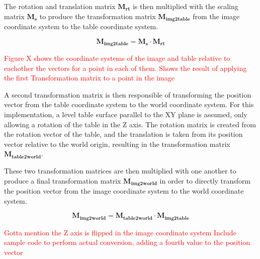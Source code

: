 The rotation and translation matrix $\mathbf{M_{rt}}$ is then multiplied with the scaling matrix $\mathbf{M_s}$ to produce the transformation matrix $\mathbf{M_{img2table}}$ from the image coordinate system to the table coordinate system.

$$\mathbf{M_{img2table}} = \mathbf{M_s} \cdot \mathbf{M_{rt}}$$

\textcolor{red}{Figure X shows the coordinate systems of the image and table relative to eachother the vectors for a point in each of them. Shows the result of applying the first Transformation matrix to a point in the image} %


A second transformation matrix is then responsible of transforming the position vector from the table coordinate system to the world coordinate system. For this implementation, a level table surface parallel to the XY plane is assumed, only allowing a rotation of the table in the Z axis. The rotation matrix is created from the rotation vector of the table, and the translation is taken from its position vector relative to the world origin, resulting in the transformation matrix $\mathbf{M_{table2world}}$.

These two transformation matrices are then multiplied with one another to produce a final transformation matrix $\mathbf{M_{img2world}}$ in order to directly transform the position vector from the image coordinate system to the world coordinate system.

$$\mathbf{M_{img2world}} = \mathbf{M_{table2world}} \cdot \mathbf{M_{img2table}}$$



\textcolor{red}{ Gotta mention the Z axis is flipped in the image coordinate system } %
\textcolor{red}{ Include sample code to perform actual conversion, adding a fourth value to the position vector} %





